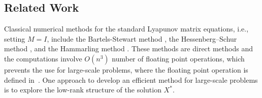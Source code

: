 \documentclass[11pt]{article}
\newcommand{\whcomm}[2]{{\sf\color{purple} #1}{\sf\color{blue} #2}}
\newcommand{\zwhcomm}[2]{{\sf\color{purple} #1}{\sf\color{blue} #2}}
\numberwithin{equation}{section}
\begin{document}

\subsection{Related Work}

Classical numerical methods for the standard Lyapunov matrix equations, i.e., setting $M=I$, include the Bartels-Stewart method \cite{BS72}, the Hessenberg–Schur method \cite{GN79}, %
and the Hammarling method \cite{Ham82}. These methods are direct methods and the computations involve $O(n^3)$ number of floating point operations, which prevents the use for large-scale problems, where the floating point operation is defined in~\cite{Golub1996MatrixC}. One approach to develop an efficient method for large-scale problems is to explore the low-rank structure of the solution $X^*$.


\end{document}
